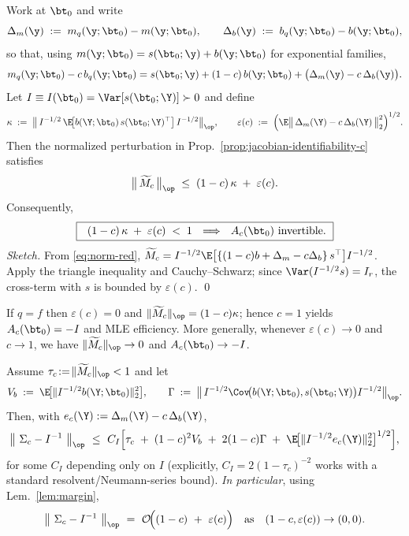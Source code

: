 \begin{lemma}
\label{lem:margin}
Work at $\bt_0$ and write
\[
\Delta_m(\y)\;:=\;m_q(\y;\bt_0)-m(\y;\bt_0),\qquad
\Delta_b(\y)\;:=\;b_q(\y;\bt_0)-b(\y;\bt_0),
\]
so that, using $m(\y;\bt_0)=s(\bt_0;\y)+b(\y;\bt_0)$ for exponential families,
\[
m_q(\y;\bt_0)-c\,b_q(\y;\bt_0)
= s(\bt_0;\y) + (1-c)\,b(\y;\bt_0) + \big(\Delta_m(\y)-c\,\Delta_b(\y)\big).
\]
Let $I \equiv I(\bt_0)=\Var[s(\bt_0;\Y)]\succ0$ and define
\[
\kappa\;:=\;\big\|\,I^{-1/2}\,\E\!\big[b(\Y;\bt_0)\,s(\bt_0;\Y)^\top\big]\,I^{-1/2}\big\|_{\op},
\qquad
\varepsilon(c)\;:=\;\Big(\E\big\|\,\Delta_m(\Y)-c\,\Delta_b(\Y)\,\big\|_2^2\Big)^{1/2}.
\]
Then the normalized perturbation in Prop.~\textup{\ref{prop:jacobian-identifiability-c}} satisfies
\[
\big\|\,\widetilde M_c\,\big\|_{\op}
\;\le\; (1-c)\,\kappa\;+\;\varepsilon(c).
\]
Consequently,
\[
\boxed{\ \ (1-c)\,\kappa\;+\;\varepsilon(c)\;<\;1\ \ \Longrightarrow\ \ A_c(\bt_0)\ \text{invertible.}\ }
\]
\emph{Sketch.} From \eqref{eq:norm-red},
$\widetilde M_c=I^{-1/2}\E\big[\{(1-c)b+\Delta_m-c\Delta_b\}\,s^\top\big]I^{-1/2}$. 
Apply the triangle inequality and Cauchy–Schwarz; since $\Var(I^{-1/2}s)=I_r$, the cross-term with $s$ is bounded by $\varepsilon(c)$.
\qed
\end{lemma}

\begin{corollary}
If $q=f$ then $\varepsilon(c)=0$ and $\|\widetilde M_c\|_{\op}=(1-c)\kappa$; hence $c=1$ yields $A_c(\bt_0)=-I$ and MLE efficiency. 
More generally, whenever $\varepsilon(c)\to0$ and $c\to1$, we have $\|\widetilde M_c\|_{\op}\to0$ and $A_c(\bt_0)\to -I$.
\end{corollary}

\begin{theorem}
\label{thm:eff-gap}
Assume $\tau_c\!:=\!\|\widetilde M_c\|_{\op}<1$ and let
\[
V_b\;:=\;\E\!\big[\|I^{-1/2}b(\Y;\bt_0)\|_2^2\big],\qquad
\Gamma\;:=\;\big\|\,I^{-1/2}\Cov\!\big(b(\Y;\bt_0),s(\bt_0;\Y)\big)I^{-1/2}\big\|_{\op}.
\]
Then, with $e_c(\Y):=\Delta_m(\Y)-c\,\Delta_b(\Y)$,
\[
\big\|\ \Sigma_c - I^{-1}\ \big\|_{\op}
\ \le\ C_I\Big[
\tau_c\;+\;(1-c)^2 V_b\;+\;2(1-c)\Gamma\;+\;\E\!\big[\|I^{-1/2}e_c(\Y)\|_2^2\big]^{1/2}\Big],
\]
for some $C_I$ depending only on $I$ (explicitly, $C_I\!=\!2(1-\tau_c)^{-2}$ works with a standard resolvent/Neumann-series bound).
\emph{In particular}, using Lem.~\ref{lem:margin},
\[
\big\|\ \Sigma_c - I^{-1}\ \big\|_{\op}
\ =\ \mathcal O\!\Big((1-c)\ +\ \varepsilon(c)\Big)
\quad\text{as}\quad (1-c,\varepsilon(c))\to(0,0).
\]
\end{theorem}

